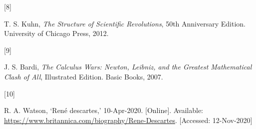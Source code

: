 \documentclass[
  12pt,
  british,
  a4paper,
]{article}
\newlength{\cslhangindent}
\newlength{\csllabelwidth}
\newenvironment{CSLReferences}[2] %
 {%
  \setlength{\parindent}{0pt}
  \ifodd #1 \everypar{\setlength{\hangindent}{\cslhangindent}}\ignorespaces\fi
  \ifnum #2 > 0
  \setlength{\parskip}{#2\baselineskip}
  \fi
 }%
 {}
\newcommand{\CSLLeftMargin}[1]{\parbox[t]{\csllabelwidth}{#1}}
\newcommand{\CSLRightInline}[1]{\parbox[t]{\linewidth - \csllabelwidth}{#1}\break}
\begin{document}
\begin{CSLReferences}{0}{0}
\leavevmode{}%
\CSLLeftMargin{{[}8{]} }
\CSLRightInline{T. S. Kuhn, \emph{{The Structure of Scientific
Revolutions}}, 50th Anniversary Edition. University of Chicago Press,
2012. }

\leavevmode{}%
\CSLLeftMargin{{[}9{]} }
\CSLRightInline{J. S. Bardi, \emph{{The Calculus Wars: Newton, Leibniz,
and the Greatest Mathematical Clash of All}}, Illustrated Edition. Basic
Books, 2007. }

\leavevmode{}%
\CSLLeftMargin{{[}10{]} }
\CSLRightInline{R. A. Watson, {`René descartes,'} 10-Apr-2020.
{[}Online{]}. Available:
\url{https://www.britannica.com/biography/Rene-Descartes}. {[}Accessed:
12-Nov-2020{]}}

\end{CSLReferences}
\end{document}
